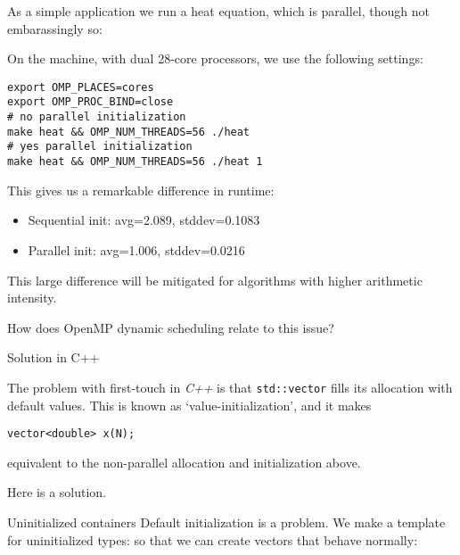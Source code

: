 As a simple application
we run a heat equation, which is parallel,
though not embarassingly so:
%
\begin{nopackt}
\end{nopackt}
\begin{packt}
\end{packt}

On the  machine, with dual 28-core
 processors,
we use the following settings:

\begin{lstlisting}[language=shell]
export OMP_PLACES=cores
export OMP_PROC_BIND=close
# no parallel initialization
make heat && OMP_NUM_THREADS=56 ./heat
# yes parallel initialization
make heat && OMP_NUM_THREADS=56 ./heat 1
\end{lstlisting}

This gives us a remarkable difference in runtime:
\begin{itemize}
\item
  Sequential init: avg=2.089, stddev=0.1083
\item
  Parallel init: avg=1.006, stddev=0.0216
\end{itemize}
This large difference will be mitigated
for algorithms with higher arithmetic intensity.

\begin{exercise}
  How does OpenMP dynamic scheduling relate to this issue?
\end{exercise}

 {Solution in C++}

The problem with first-touch in \emph{C++}%
%
is that \lstinline+std::vector+ fills its allocation with default values.
This is known as `value-initialization', and it makes
\begin{lstlisting}
vector<double> x(N);
\end{lstlisting}
equivalent to the non-parallel allocation and initialization above.

Here is a solution.
\begin{cppnote}{Uninitialized containers}
  \label{cpp:uninitial}
  Default initialization is a problem.
  We make a template for uninitialized types:
  so that we can create vectors that behave normally:
\end{cppnote}

